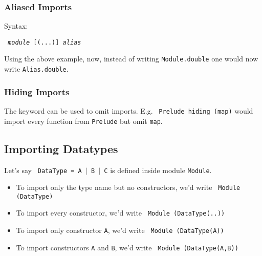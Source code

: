 \subsubsection{Aliased Imports}

Syntax:

\begin{center}
  \texttt{ \textit{module} [(...)]  \textit{alias}}
\end{center}

Using the above example, now, instead of writing \texttt{Module.double} one would now write \texttt{Alias.double}.

\subsubsection{Hiding Imports}
The \texttt{} keyword can be used to omit imports.
E.g. \texttt{ Prelude \texttt{hiding} (map)} would import every function from \texttt{Prelude} but omit \texttt{map}.

\subsection{Importing Datatypes}
Let's say \texttt{ DataType = A $\mid$ B $\mid$ C} is defined inside module \texttt{Module}.

\begin{itemize}
  \item To import only the type name but no constructors, we'd write \texttt{ Module (DataType)}
  \item To import every constructor, we'd write \texttt{ Module (DataType(..))}
  \item To import only constructor \texttt{A}, we'd write \texttt{ Module (DataType(A))}
  \item To import constructors \texttt{A} and \texttt{B}, we'd write \texttt{ Module (DataType(A,B))}
\end{itemize}